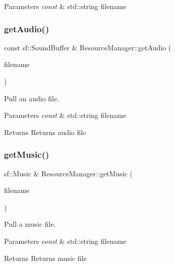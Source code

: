 \begin{DoxyParams}{Parameters}
{\em const} & std\+::string filename \\
\hline
\end{DoxyParams}
\mbox{\label{class_resource_manager_a7804aec5b1d1c5c196db33c23eab4153}} 
\subsubsection{\texorpdfstring{get\+Audio()}{getAudio()}}
{\footnotesize\ttfamily const sf\+::\+Sound\+Buffer \& Resource\+Manager\+::get\+Audio (\begin{DoxyParamCaption}\item[{const std\+::string \&}]{filename }\end{DoxyParamCaption})}



Pull an audio file. 


\begin{DoxyParams}{Parameters}
{\em const} & std\+::string filename \\
\hline
\end{DoxyParams}
\begin{DoxyReturn}{Returns}
Returns audio file 
\end{DoxyReturn}
\mbox{\label{class_resource_manager_aae797e6ff05c541b9d880669d4817fb7}} 
\subsubsection{\texorpdfstring{get\+Music()}{getMusic()}}
{\footnotesize\ttfamily sf\+::\+Music \& Resource\+Manager\+::get\+Music (\begin{DoxyParamCaption}\item[{const std\+::string \&}]{filename }\end{DoxyParamCaption})}



Pull a music file. 


\begin{DoxyParams}{Parameters}
{\em const} & std\+::string filename \\
\hline
\end{DoxyParams}
\begin{DoxyReturn}{Returns}
Returns music file 
\end{DoxyReturn}
\mbox{\label{class_resource_manager_abdcc5ba3056bf5ecd282fd6a3249da67}} 
